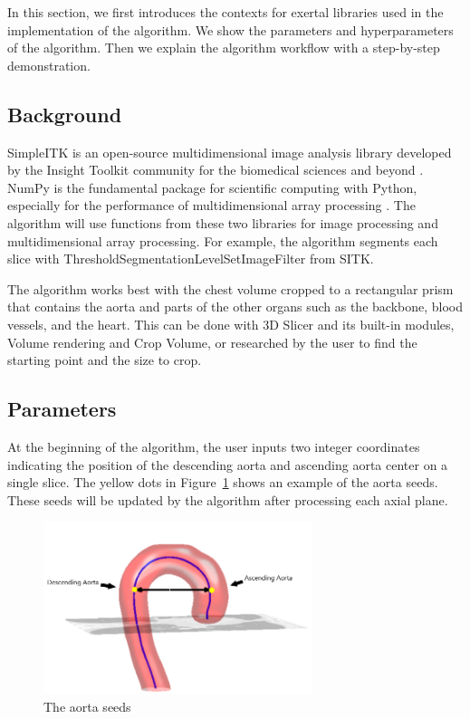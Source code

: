 In this section, we first introduces the contexts for exertal libraries used in the implementation of the algorithm. We show the parameters and hyperparameters of the algorithm. Then we explain the algorithm workflow with a step-by-step demonstration.

\subsection{Background} \label{algo_bg}

SimpleITK is an open-source multidimensional image analysis library developed by the Insight Toolkit community for the biomedical sciences and beyond \cite{JSSv086i08}\cite{10.3389/fninf.2013.00045}. NumPy is the fundamental package for scientific computing with Python, especially for the performance of multidimensional array processing \cite{harris2020array}. The algorithm will use functions from these two libraries for image processing and multidimensional array processing. For example, the algorithm segments each slice with ThresholdSegmentationLevelSetImageFilter from SITK.

The algorithm works best with the chest volume cropped to a rectangular prism that contains the aorta and parts of the other organs such as the backbone, blood vessels, and the heart. This can be done with 3D Slicer and its built-in modules, Volume rendering and Crop Volume, or researched by the user to find the starting point and the size to crop.

\subsection{Parameters}

At the beginning of the algorithm, the user inputs two integer coordinates indicating the position of the descending aorta and ascending aorta center on a single slice. The yellow dots in Figure~\ref{fig_aorta_seed} shows an example of the aorta seeds. These seeds will be updated by the algorithm after processing each axial plane.

\begin{figure}[ht]
    \centering
    \includegraphics[width=0.7\textwidth]{figures/Sample/Aorta_seeds.png}
    \caption[The Aorta Seeds]{The aorta seeds \citep{6346433}}
    \label{fig_aorta_seed}
\end{figure}

